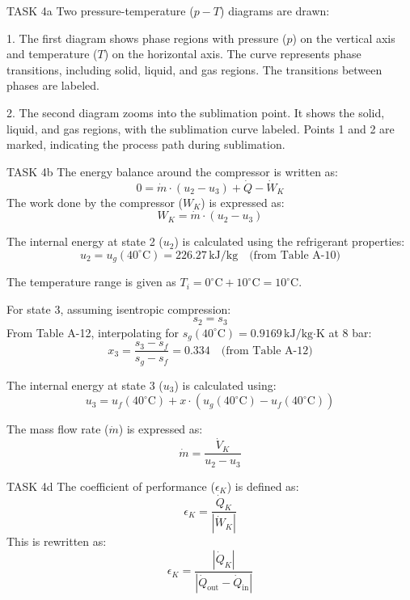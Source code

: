 TASK 4a  
Two pressure-temperature (\(p-T\)) diagrams are drawn:  

1. The first diagram shows phase regions with pressure (\(p\)) on the vertical axis and temperature (\(T\)) on the horizontal axis. The curve represents phase transitions, including solid, liquid, and gas regions. The transitions between phases are labeled.  

2. The second diagram zooms into the sublimation point. It shows the solid, liquid, and gas regions, with the sublimation curve labeled. Points 1 and 2 are marked, indicating the process path during sublimation.  

TASK 4b  
The energy balance around the compressor is written as:  
\[
0 = \dot{m} \cdot (u_2 - u_3) + \dot{Q} - \dot{W}_K
\]  
The work done by the compressor (\(W_K\)) is expressed as:  
\[
W_K = \dot{m} \cdot (u_2 - u_3)
\]  

The internal energy at state 2 (\(u_2\)) is calculated using the refrigerant properties:  
\[
u_2 = u_g(40^\circ\text{C}) = 226.27 \, \text{kJ/kg} \quad \text{(from Table A-10)}
\]  

The temperature range is given as \(T_i = 0^\circ\text{C} + 10^\circ\text{C} = 10^\circ\text{C}\).  

For state 3, assuming isentropic compression:  
\[
s_2 = s_3
\]  
From Table A-12, interpolating for \(s_g(40^\circ\text{C}) = 0.9169 \, \text{kJ/kg·K}\) at 8 bar:  
\[
x_3 = \frac{s_3 - s_f}{s_g - s_f} = 0.334 \quad \text{(from Table A-12)}
\]  

The internal energy at state 3 (\(u_3\)) is calculated using:  
\[
u_3 = u_f(40^\circ\text{C}) + x \cdot (u_g(40^\circ\text{C}) - u_f(40^\circ\text{C}))
\]  

The mass flow rate (\(\dot{m}\)) is expressed as:  
\[
\dot{m} = \frac{\dot{V}_K}{u_2 - u_3}
\]  

TASK 4d  
The coefficient of performance (\(\epsilon_K\)) is defined as:  
\[
\epsilon_K = \frac{\dot{Q}_K}{|\dot{W}_K|}
\]  
This is rewritten as:  
\[
\epsilon_K = \frac{|\dot{Q}_K|}{|\dot{Q}_{\text{out}} - \dot{Q}_{\text{in}}|}
\]  